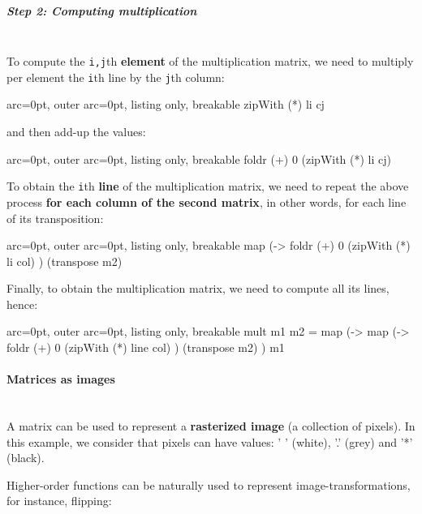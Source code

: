 \subparagraph{ Step 2: Computing multiplication }\hfill\\

To compute the \texttt{i,j}th \textbf{element} of the multiplication matrix, we need to multiply per element the \texttt{i}th line by the \texttt{j}th column:

\begin{tcblisting}{ arc=0pt, outer arc=0pt, listing only, breakable}
zipWith (*) li cj

\end{tcblisting}

and then add-up the values:

\begin{tcblisting}{ arc=0pt, outer arc=0pt, listing only, breakable}
foldr (+) 0 (zipWith (*) li cj)

\end{tcblisting}


To obtain the \texttt{i}th \textbf{line} of the multiplication matrix, we need to repeat the above process \textbf{for each column of the second matrix}, in other words, for each line of its transposition:


\begin{tcblisting}{ arc=0pt, outer arc=0pt, listing only, breakable}
map (\col -> foldr (+) 0 (zipWith (*) li col) ) (transpose m2)

\end{tcblisting}


Finally, to obtain the multiplication matrix, we need to compute all its lines, hence:

\begin{tcblisting}{ arc=0pt, outer arc=0pt, listing only, breakable}
mult m1 m2 = 
  map (\line -> map (\col -> foldr (+) 0 (zipWith (*) line col) ) (transpose m2) ) m1

\end{tcblisting}


\paragraph{ Matrices as images }\hfill\\

A matrix can be used to represent a \textbf{rasterized image} (a collection of pixels). In this example, we consider that pixels can have values: ' ' (white), '.' (grey) and '*' (black).

Higher-order functions can be naturally used to represent image-transformations, for instance, flipping:


